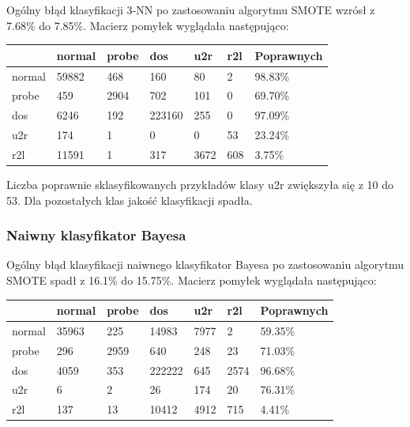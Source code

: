 \documentclass[a4paper, 12pt]{article}
\begin{document}
Ogólny błąd klasyfikacji 3-NN po zastosowaniu algorytmu SMOTE wzrósł z 7.68\% do 7.85\%.
Macierz pomyłek wyglądała następująco:

\begin{table}[H]
\centering
\begin{tabular}{ | l | l | l | l | l | l | l | } \hline
	& normal & probe & dos 	& u2r 	& r2l 	& Poprawnych	\\ \hline
normal &  59882 &   468 &  160  & 80  	&  2 	& 98.83\% \\ \hline
probe  &  459 & 2904  &  702  &  101 	& 0 	& 69.70\% \\ \hline
dos    &  6246  &  192 & 223160 &  255  & 0 	& 97.09\% \\ \hline
u2r    &    174   &  1   &   0 &  0 	& 53 	& 23.24\% \\ \hline
r2l    &  11591   &  1   &   317 &  3672 &  608 & 3.75\% \\ \hline
\end{tabular} 
\end{table}

Liczba poprawnie sklasyfikowanych przykładów klasy u2r zwiększyła się z 10 do 53.
Dla pozostałych klas jakość klasyfikacji spadła.

\subsubsection{Naiwny klasyfikator Bayesa}

Ogólny błąd klasyfikacji naiwnego klasyfikator Bayesa po zastosowaniu algorytmu SMOTE 
spadł z 16.1\% do 15.75\%. Macierz pomyłek wyglądała następująco:

\begin{table}[H]
\centering
\begin{tabular}{ | l | l | l | l | l | l | l | } \hline
	& normal & probe & dos 	& u2r 	& r2l 	& Poprawnych	\\ \hline
normal &  35963 &   225 &  14983  & 7977  &  2 	& 59.35\% \\ \hline
probe  &  296 & 2959  &  640  &  248 	& 23 	& 71.03\% \\ \hline
dos    &  4059  &  353 & 222222 &  645  & 2574 	& 96.68\% \\ \hline
u2r    &    6   &  2   &   26 &  174 	& 20 	& 76.31\% \\ \hline
r2l    &  137   &  13   &   10412 &  4912 &  715 & 4.41\% \\ \hline
\end{tabular} 
\end{table}
\end{document}
